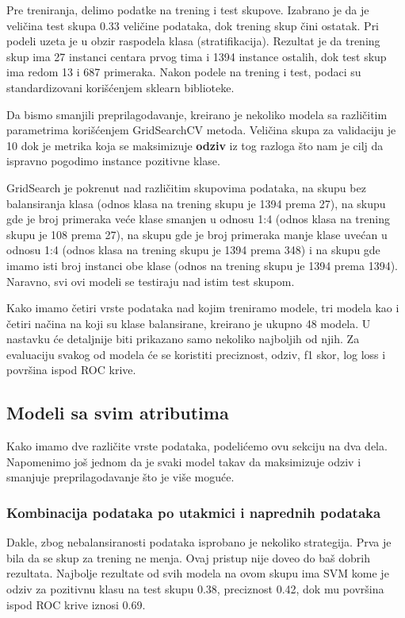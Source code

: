 \documentclass[a4paper]{article}
\begin{document}
Pre treniranja, delimo podatke na trening i test skupove. Izabrano je da je
veličina test skupa 0.33 veličine podataka, dok trening skup čini ostatak. Pri
podeli uzeta je u obzir raspodela klasa (stratifikacija). Rezultat je da trening skup ima 27 instanci centara prvog tima i 1394 instance ostalih, dok test skup ima redom 13 i 687 primeraka. Nakon podele na trening i test, podaci su standardizovani korišćenjem sklearn biblioteke.

Da bismo smanjili preprilagodavanje, kreirano je nekoliko modela sa različitim parametrima korišćenjem GridSearchCV metoda. Veličina skupa za validaciju je 10 dok je metrika koja se maksimizuje \textbf{odziv} iz tog razloga što nam je cilj da ispravno pogodimo instance pozitivne klase.

GridSearch je pokrenut nad različitim skupovima podataka, na skupu bez
balansiranja klasa (odnos klasa na trening skupu je 1394 prema 27), na skupu
gde je broj primeraka veće klase smanjen u odnosu 1:4 (odnos klasa na trening
skupu je 108 prema 27), na skupu gde je broj primeraka manje klase uvećan u
odnosu 1:4 (odnos klasa na trening skupu je 1394 prema 348) i na skupu gde
imamo isti broj instanci obe klase (odnos na trening skupu je 1394 prema 1394).
Naravno, svi ovi modeli se testiraju nad istim test skupom.

Kako imamo četiri vrste podataka nad kojim treniramo modele, tri modela
kao i četiri načina na koji su klase balansirane, kreirano je ukupno 48 modela. U
nastavku će detaljnije biti prikazano samo nekoliko najboljih od njih. Za evaluaciju svakog od modela će se koristiti preciznost, odziv, f1 skor, log loss i površina ispod ROC krive.

\subsection{Modeli sa svim atributima}
\label{subsec:svi_atributi}

Kako imamo dve različite vrste podataka, podelićemo ovu sekciju na dva dela. Napomenimo još jednom da je svaki model takav da maksimizuje odziv i smanjuje preprilagodavanje što je više moguće.

\subsubsection{Kombinacija podataka po utakmici i naprednih podataka}
\label{subsubsec:kombo_pg_adv}

Dakle, zbog nebalansiranosti podataka isprobano je nekoliko strategija. Prva
je bila da se skup za trening ne menja. Ovaj pristup nije doveo do baš dobrih
rezultata. Najbolje rezultate od svih modela na ovom skupu ima SVM kome je
odziv za pozitivnu klasu na test skupu 0.38, preciznost 0.42, dok mu površina
ispod ROC krive iznosi 0.69.
\end{document}
